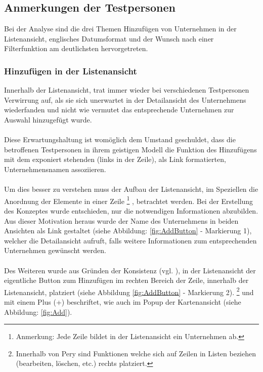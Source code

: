 \documentclass[Bachelorarbeit.tex]{subfiles}
\begin{document}
\subsection{Anmerkungen der Testpersonen}
Bei der Analyse sind die drei Themen Hinzufügen von Unternehmen in der Listenansicht, englisches Datumsformat und der Wunsch nach einer Filterfunktion am deutlichsten hervorgetreten.\\

\subsubsection*{Hinzufügen in der Listenansicht}
Innerhalb der Listenansicht, trat immer wieder bei verschiedenen Testpersonen Verwirrung auf, als sie sich unerwartet in der Detailansicht des Unternehmens wiederfanden und nicht wie vermutet das entsprechende Unternehmen zur Auswahl hinzugefügt wurde.
\\
\\
Diese Erwartungshaltung ist womöglich dem Umstand geschuldet, dass die betroffenen Testpersonen in ihrem geistigen Modell die Funktion des Hinzufügens mit dem exponiert stehenden (links in der Zeile), als Link formatierten, Unternehmensnamen assoziieren. \\
\\
Um dies besser zu verstehen muss der Aufbau der Listenansicht, im Speziellen die Anordnung der Elemente in einer Zeile
\footnote
{
	Anmerkung: Jede Zeile bildet in der Listenansicht ein Unternehmen ab.
}
, betrachtet werden.
Bei der Erstellung des Konzeptes wurde entschieden, nur die notwendigen Informationen abzubilden. Aus dieser Motivation heraus wurde der Name des Unternehmens in beiden Ansichten als Link gestaltet (siehe Abbildung: \ref{fig:AddButton} - Markierung 1), welcher die Detailansicht aufruft, falls weitere Informationen zum entsprechenden Unternehmen gewünscht werden.
\\
\\
Des Weiteren wurde aus Gründen der Konsistenz (vgl. \cite[S. 103, 11:4 Ensure Visual Consistency]{Koyani2004}), in der Listenansicht der eigentliche Button zum Hinzufügen im rechten Bereich der Zeile, innerhalb der Listenansicht, platziert (siehe Abbildung \ref{fig:AddButton} - Markierung 2). 
\footnote{
	Innerhalb von Pery sind Funktionen welche sich auf Zeilen in Listen beziehen (bearbeiten, löschen, etc.) rechts platziert.
	} 
und mit einem Plus (+) beschriftet, wie auch im Popup der Kartenansicht (siehe Abbildung: \ref{fig:Add}).\\
\end{document}
